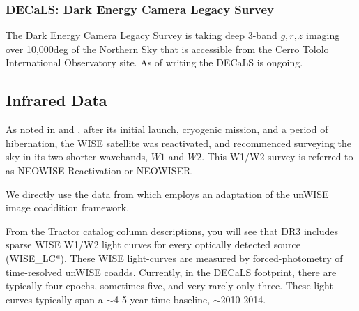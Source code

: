 \documentclass{emulateapj}
\begin{document}
    \subsubsection{DECaLS: Dark Energy Camera Legacy Survey}
    The Dark Energy Camera Legacy Survey \citep[DECaLS; ][]{Lang16} is
    taking deep 3-band $g,r,z$ imaging over 10,000deg of the Northern Sky
    that is accessible from the Cerro Tololo International Observatory
    site. As of writing the DECaLS is ongoing.
        
\subsection{Infrared Data}
As noted in \citet{Mainzer14} and \citet{Meisner16}, after its initial
launch, cryogenic mission, and a period of hibernation, the WISE
satellite was reactivated, and recommenced surveying the sky in its
two shorter wavebands, $W1$ and $W2$.  This W1/W2 survey is referred
to as NEOWISE-Reactivation or NEOWISER.
    
We directly use the data from \citet{Meisner16} which employs an
adaptation of the unWISE \citet{Lang14} image coaddition framework.
    
From the Tractor catalog column descriptions, you will
see that DR3 includes sparse WISE W1/W2 light curves for every
optically detected source (WISE\_LC*). These WISE light-curves are
measured by forced-photometry of time-resolved unWISE coadds.
Currently, in the DECaLS footprint, there are typically four epochs,
sometimes five, and very rarely only three. These light curves
typically span a $\sim$4-5 year time baseline, $\sim$2010-2014.
   
\end{document}
